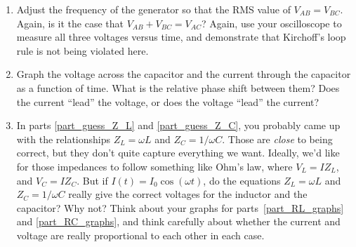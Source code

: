 \begin{enumerate}[wide]
\item Adjust the frequency of the generator so that the RMS value of $V_{AB} = V_{BC}$.   Again, is it the case that $V_{AB} + V_{BC} = V_{AC}$?  Again, use your oscilloscope to measure all three voltages versus time, and demonstrate that Kirchoff's loop rule is not being violated here.  

\item Graph the voltage across the capacitor and the current through the capacitor as a function of time.  What is the relative phase shift between them?  Does the current ``lead'' the voltage, or does the voltage ``lead'' the current? \label{part_RC_graphs}

\vfill

\item In parts \ref{part_guess_Z_L} and \ref{part_guess_Z_C}, you probably came up with the relationships $Z_L = \omega L$ and $Z_C = 1/ \omega C$.  Those are \textit{close} to being correct, but they don't quite capture everything we want.  Ideally, we'd like for those impedances to follow something like Ohm's law, where $V_L = I Z_L$, and $V_C = I Z_C$.  But if  $I(t) = I_0 \cos(\omega t)$, do the equations $Z_L = \omega L$ and $Z_C = 1/ \omega C$ really give the correct voltages for the inductor and the capacitor?  Why not?  Think about your graphs for parts~\ref{part_RL_graphs} and \ref{part_RC_graphs}, and think carefully about whether the current and voltage are really proportional to each other in each case.

\vfill

\end{enumerate}





